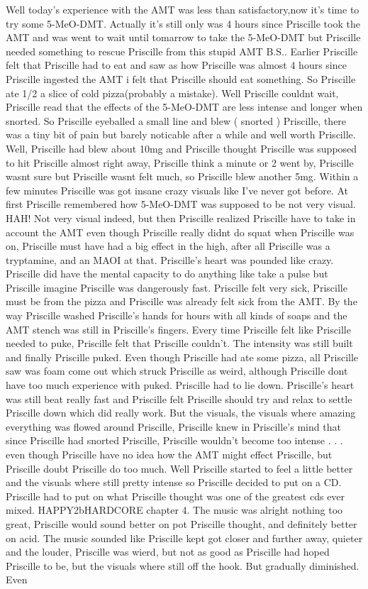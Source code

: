 \documentclass[12pt]{book}
\begin{document}
Well today's experience with the AMT was less than satisfactory,now it's time to try some 5-MeO-DMT. Actually it's still only was 4 hours since Priscille took the AMT and was went to wait until tomarrow to take the 5-MeO-DMT but Priscille needed something to rescue Priscille from this stupid AMT B.S.. Earlier Priscille felt that Priscille had to eat and saw as how Priscille was almost 4 hours since Priscille ingested the AMT i felt that Priscille should eat something. So Priscille ate 1/2 a slice of cold pizza(probably a mistake). Well Priscille couldnt wait, Priscille read that the effects of the 5-MeO-DMT are less intense and longer when snorted. So Priscille eyeballed a small line and blew ( snorted ) Priscille, there was a tiny bit of pain but barely noticable after a while and well worth Priscille. Well, Priscille had blew about 10mg and Priscille thought Priscille was supposed to hit Priscille almost right away, Priscille think a minute or 2 went by, Priscille wasnt sure but Priscille wasnt felt much, so Priscille blew another 5mg. Within a few minutes Priscille was got insane crazy visuals like I've never got before. At first Priscille remembered how 5-MeO-DMT was supposed to be not very visual. HAH! Not very visual indeed, but then Priscille realized Priscille have to take in account the AMT even though Priscille really didnt do squat when Priscille was on, Priscille must have had a big effect in the high, after all Priscille was a tryptamine, and an MAOI at that. Priscille's heart was pounded like crazy. Priscille did have the mental capacity to do anything like take a pulse but Priscille imagine Priscille was dangerously fast. Priscille felt very sick, Priscille must be from the pizza and Priscille was already felt sick from the AMT. By the way Priscille washed Priscille's hands for hours with all kinds of soaps and the AMT stench was still in Priscille's fingers. Every time Priscille felt like Priscille needed to puke, Priscille felt that Priscille couldn't. The intensity was still built and finally Priscille puked. Even though Priscille had ate some pizza, all Priscille saw was foam come out which struck Priscille as weird, although Priscille dont have too much experience with puked. Priscille had to lie down. Priscille's heart was still beat really fast and Priscille felt Priscille should try and relax to settle Priscille down which did really work. But the visuals, the visuals where amazing everything was flowed around Priscille, Priscille knew in Priscille's mind that since Priscille had snorted Priscille, Priscille wouldn't become too intense . . .  even though Priscille have no idea how the AMT might effect Priscille, but Priscille doubt Priscille do too much. Well Priscille started to feel a little better and the visuals where still pretty intense so Priscille decided to put on a CD. Priscille had to put on what Priscille thought was one of the greatest cds ever mixed. HAPPY2bHARDCORE chapter 4. The music was alright nothing too great, Priscille would sound better on pot Priscille thought, and definitely better on acid. The music sounded like Priscille kept got closer and further away, quieter and the louder, Priscille was wierd, but not as good as Priscille had hoped Priscille to be, but the visuals where still off the hook. But gradually diminished. Even 
\end{document}
